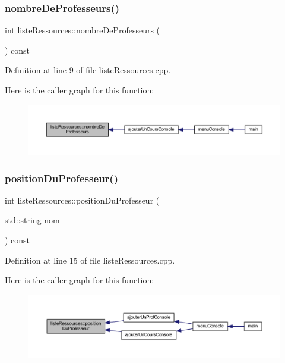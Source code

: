\subsubsection{\texorpdfstring{nombre\+De\+Professeurs()}{nombreDeProfesseurs()}}
{\footnotesize\ttfamily int liste\+Ressources\+::nombre\+De\+Professeurs (\begin{DoxyParamCaption}{ }\end{DoxyParamCaption}) const}



Definition at line 9 of file liste\+Ressources.\+cpp.

Here is the caller graph for this function\+:\nopagebreak
\begin{figure}[H]
\begin{center}
\leavevmode
\includegraphics[width=350pt]{classliste_ressources_a9b496a36a9651347734d7895397dde00_icgraph}
\end{center}
\end{figure}
\hypertarget{classliste_ressources_a1ba16dd4280006301dc94d467b9dddaa}{}\label{classliste_ressources_a1ba16dd4280006301dc94d467b9dddaa} 
\subsubsection{\texorpdfstring{position\+Du\+Professeur()}{positionDuProfesseur()}}
{\footnotesize\ttfamily int liste\+Ressources\+::position\+Du\+Professeur (\begin{DoxyParamCaption}\item[{std\+::string}]{nom }\end{DoxyParamCaption}) const}



Definition at line 15 of file liste\+Ressources.\+cpp.

Here is the caller graph for this function\+:\nopagebreak
\begin{figure}[H]
\begin{center}
\leavevmode
\includegraphics[width=350pt]{classliste_ressources_a1ba16dd4280006301dc94d467b9dddaa_icgraph}
\end{center}
\end{figure}
\hypertarget{classliste_ressources_acd47bea2a7105b73adcf0891b82d2e1c}{}\label{classliste_ressources_acd47bea2a7105b73adcf0891b82d2e1c} 
